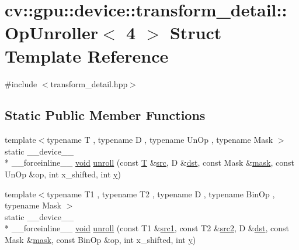 \hypertarget{structcv_1_1gpu_1_1device_1_1transform__detail_1_1OpUnroller_3_014_01_4}{\section{cv\-:\-:gpu\-:\-:device\-:\-:transform\-\_\-detail\-:\-:Op\-Unroller$<$ 4 $>$ Struct Template Reference}
\label{structcv_1_1gpu_1_1device_1_1transform__detail_1_1OpUnroller_3_014_01_4}
}


{\ttfamily \#include $<$transform\-\_\-detail.\-hpp$>$}

\subsection*{Static Public Member Functions}
\begin{DoxyCompactItemize}
\item 
{\footnotesize template$<$typename T , typename D , typename Un\-Op , typename Mask $>$ }\\static \-\_\-\-\_\-device\-\_\-\-\_\- \\*
\-\_\-\-\_\-forceinline\-\_\-\-\_\- \hyperlink{legacy_8hpp_a8bb47f092d473522721002c86c13b94e}{void} \hyperlink{structcv_1_1gpu_1_1device_1_1transform__detail_1_1OpUnroller_3_014_01_4_ac348dcbbe75a172a9d8542428f0efd11}{unroll} (const \hyperlink{calib3d_8hpp_a3efb9551a871ddd0463079a808916717}{T} \&\hyperlink{legacy_8hpp_a371cd109b74033bc4366f584edd3dacc}{src}, D \&\hyperlink{photo__c_8h_aed13e2a25279b24dc954073233fef7a5}{dst}, const Mask \&\hyperlink{tracking_8hpp_a6b13ecd2fd6ec7ad422f1d7863c3ad19}{mask}, const Un\-Op \&op, int x\-\_\-shifted, int \hyperlink{highgui__c_8h_af1202c02b14870c18fb3a1da73e9e7c7}{y})
\item 
{\footnotesize template$<$typename T1 , typename T2 , typename D , typename Bin\-Op , typename Mask $>$ }\\static \-\_\-\-\_\-device\-\_\-\-\_\- \\*
\-\_\-\-\_\-forceinline\-\_\-\-\_\- \hyperlink{legacy_8hpp_a8bb47f092d473522721002c86c13b94e}{void} \hyperlink{structcv_1_1gpu_1_1device_1_1transform__detail_1_1OpUnroller_3_014_01_4_a76296f284e70e76845aeda7d0ab8d291}{unroll} (const T1 \&\hyperlink{core__c_8h_a897de4702c922f4cccda0d57ccdcafb3}{src1}, const T2 \&\hyperlink{core__c_8h_a7561a36d48069d54a6c8ac4e4750edfd}{src2}, D \&\hyperlink{photo__c_8h_aed13e2a25279b24dc954073233fef7a5}{dst}, const Mask \&\hyperlink{tracking_8hpp_a6b13ecd2fd6ec7ad422f1d7863c3ad19}{mask}, const Bin\-Op \&op, int x\-\_\-shifted, int \hyperlink{highgui__c_8h_af1202c02b14870c18fb3a1da73e9e7c7}{y})
\end{DoxyCompactItemize}


